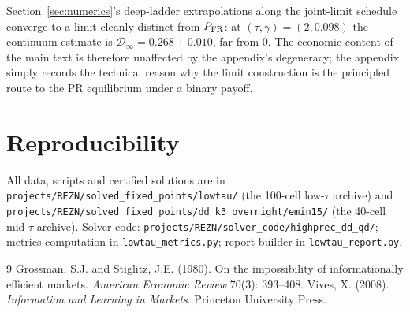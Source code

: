 \documentclass[11pt]{article}
\newcommand{\1}{\mathbf{1}}
\newcommand{\deficit}{\mathcal{D}}
\begin{document}
Section~\ref{sec:numerics}'s deep-ladder extrapolations along the
joint-limit schedule converge to a limit cleanly distinct from
$P_{\rm FR}$: at $(\tau,\gamma)=(2,0.098)$ the continuum estimate is
$\deficit_\infty=0.268\pm 0.010$, far from $0$. The economic content of
the main text is therefore unaffected by the appendix's degeneracy;
the appendix simply records the technical reason why the limit
construction is the principled route to the PR equilibrium under a
binary payoff.

\section{Reproducibility}

All data, scripts and certified solutions are in
\texttt{projects/REZN/solved\_fixed\_points/lowtau/} (the 100-cell
low-$\tau$ archive) and
\texttt{projects/REZN/solved\_fixed\_points/dd\_k3\_overnight/emin15/}
(the 40-cell mid-$\tau$ archive). Solver code:
\texttt{projects/REZN/solver\_code/highprec\_dd\_qd/}; metrics computation in
\texttt{lowtau\_metrics.py}; report builder in \texttt{lowtau\_report.py}.

\begin{thebibliography}{9}
 Grossman, S.J. and Stiglitz, J.E. (1980). On the
impossibility of informationally efficient markets. \emph{American
Economic Review} 70(3): 393--408.
 Vives, X. (2008). \emph{Information and Learning in
Markets}. Princeton University Press.
\end{thebibliography}
\end{document}
